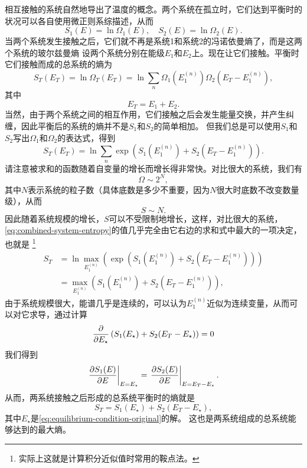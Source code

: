 \documentclass[hyperref, UTF8, a4paper]{ctexart}
\begin{document}
相互接触的系统自然地导出了温度的概念。两个系统在孤立时，它们达到平衡时的状况可以各自使用微正则系综描述，从而
\[
    S_1(E) = \ln \Omega_1 (E), \quad S_2 (E) = \ln \Omega_2 (E).
\]
当两个系统发生接触之后，它们就不再是系统1和系统2的冯诺依曼熵了，而是这两个系统的玻尔兹曼熵
设两个系统分别在能级$E_1$和$E_2$上。现在让它们接触。平衡时它们接触而成的总系统的熵为
\[
    S_T(E_T) = \ln \Omega_T (E_T) = \ln \sum_{n} \Omega_1 (E_1^{(n)}) \Omega_2 (E_T - E_1^{(n)}),
\]
其中
\[
    E_T = E_1 + E_2.
\]
当然，由于两个系统之间的相互作用，它们接触之后会发生能量交换，并产生纠缠，因此平衡后的系统的熵并不是$S_1$和$S_2$的简单相加。
但我们总是可以使用$S_1$和$S_2$写出$\Omega_1$和$\Omega_2$的表达式，得到
\begin{equation}
    S_T(E_T) = \ln \sum_{n} \exp \left(S_1(E_1^{(n)})+S_2(E_T-E_1^{(n)})\right).
    \label{eq:combined-system-entropy}
\end{equation}
请注意被求和的函数随着自变量的增长而增长得非常快。对比很大的系统，我们有
\[
    \Omega \sim 2^N,
\]
其中$N$表示系统的粒子数（具体底数是多少不重要，因为$N$很大时底数不改变数量级），从而
\[
    S \sim N.
\]
因此随着系统规模的增长，$S$可以不受限制地增长，这样，对比很大的系统，\eqref{eq:combined-system-entropy}的值几乎完全由它右边的求和式中最大的一项决定，也就是%
\footnote{实际上这就是计算积分近似值时常用的鞍点法。}
\[
    \begin{aligned}
        S_T &= \ln \max_{E_1^{(n)}} \left( \exp \left(S_1(E_1^{(n)})+S_2(E_T-E_1^{(n)})\right) \right) \\
        &= \max_{E_1^{(n)}} \left(S_1(E_1^{(n)})+S_2(E_T-E_1^{(n)})\right),
    \end{aligned}
\]
由于系统规模很大，能谱几乎是连续的，可以认为$E_1^{(n)}$近似为连续变量，从而可以对它求导，通过计算
\[
    \pdv{E_\star} \left( S_1(E_\star) + S_2(E_T-E_\star) \right) = 0
\]
我们得到
\begin{equation}
    \eval{\pdv{S_1(E)}{E}}_{E=E_\star} = \eval{\pdv{S_2(E)}{E}}_{E=E_T-E_\star}.
    \label{eq:equilibrium-condition-original}
\end{equation}
从而，两系统接触之后形成的总系统平衡时的熵就是
\begin{equation}
    S_T = S_1(E_\star) + S_2(E_T-E_\star),
\end{equation}
其中$E_\star$是\eqref{eq:equilibrium-condition-original}的解。
这也是两系统组成的总系统能够达到的最大熵。
\end{document}
